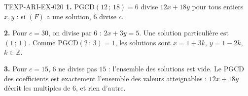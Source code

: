 \begin{corrige}{TEXP-ARI-EX-020}
\textbf{1.} $\mathrm{PGCD}(12\,;\,18)=6$ divise $12x+18y$ pour tous entiers
$x,y$ : si $(F)$ a une solution, $6$ divise $c$.

\textbf{2.} Pour $c=30$, on divise par $6$ : $2x+3y=5$. Une solution
particulière est $(1\,;\,1)$. Comme $\mathrm{PGCD}(2\,;\,3)=1$, les solutions
sont $x=1+3k$, $y=1-2k$, $k\in\mathbb{Z}$.

\textbf{3.} Pour $c=15$, $6$ ne divise pas $15$ : l'ensemble des solutions est
vide. Le PGCD des coefficients est exactement l'ensemble des valeurs
atteignables : $12x+18y$ décrit les multiples de $6$, et rien d'autre.
\end{corrige}
